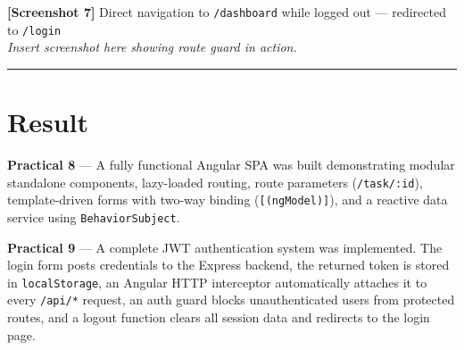 \documentclass[11pt,a4paper]{article}
\begin{document}
\begin{screenshotbox}
\textbf{[Screenshot 7]} Direct navigation to \texttt{/dashboard} while logged out — redirected to \texttt{/login}\\[4pt]
\textit{Insert screenshot here showing route guard in action.}\\[45pt]
\rule{\linewidth}{0.4pt}
\end{screenshotbox}

\section*{Result}

\textbf{Practical 8} — A fully functional Angular SPA was built demonstrating modular
standalone components, lazy-loaded routing, route parameters (\texttt{/task/:id}),
template-driven forms with two-way binding (\texttt{[(ngModel)]}), and a reactive data
service using \texttt{BehaviorSubject}.

\textbf{Practical 9} — A complete JWT authentication system was implemented.  The login
form posts credentials to the Express backend, the returned token is stored in
\texttt{localStorage}, an Angular HTTP interceptor automatically attaches it to every
\texttt{/api/*} request, an auth guard blocks unauthenticated users from protected routes,
and a logout function clears all session data and redirects to the login page.
\end{document}
